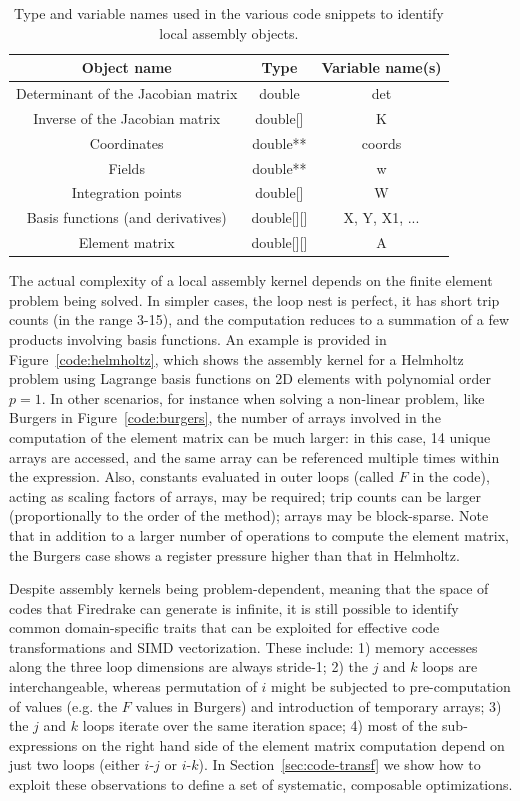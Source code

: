 \documentclass[conference]{IEEEtran}
\begin{document}
\begin{table}[h]
\begin{center}
\begin{tabulary}{1.0\columnwidth}{|C|C|C|}
\hline
Object name & Type & Variable name(s) \\\hline\hline
Determinant of the Jacobian matrix & double & det  \\ \hline
Inverse of the Jacobian matrix & double[] & K \\ \hline
Coordinates & double** & coords\\ \hline
Fields & double** & w \\ \hline
Integration points & double[] & W \\ \hline
Basis functions (and derivatives) & double[][] & X, Y, X1, ... \\ \hline
Element matrix & double[][] & A\\ \hline
\end{tabulary}
\end{center}
\caption{Type and variable names used in the various code snippets to identify local assembly objects.}
\label{table:map-name-letters}
\end{table}

The actual complexity of a local assembly kernel depends on the finite element problem being solved. In simpler cases, the loop nest is perfect, it has short trip counts (in the range 3-15), and the computation reduces to a summation of a few products involving basis functions. An example is provided in Figure~\ref{code:helmholtz}, which shows the assembly kernel for a Helmholtz problem using Lagrange basis functions on 2D elements with polynomial order $p=1$. In other scenarios, for instance when solving a non-linear problem, like Burgers in Figure~\ref{code:burgers}, the number of arrays involved in the computation of the element matrix can be much larger: in this case, 14 unique arrays are accessed, and the same array can be referenced multiple times within the expression. Also, constants evaluated in outer loops (called $F$ in the code), acting as scaling factors of arrays, may be required; trip counts can be larger (proportionally to the order of the method); arrays may be block-sparse. Note that in addition to a larger number of operations to compute the element matrix, the Burgers case shows a register pressure higher than that in Helmholtz. 

Despite assembly kernels being problem-dependent, meaning that the space of codes that Firedrake can generate is infinite, it is still possible to identify common domain-specific traits that can be exploited for effective code transformations and SIMD vectorization. These include: 1) memory accesses along the three loop dimensions are always stride-1; 2) the $j$ and $k$ loops are interchangeable, whereas permutation of $i$ might be subjected to pre-computation of values (e.g. the $F$ values in Burgers) and introduction of temporary arrays; 3) the $j$ and $k$ loops iterate over the same iteration space; 4) most of the sub-expressions on the right hand side of the element matrix computation depend on just two loops (either $i$-$j$ or $i$-$k$). In Section~\ref{sec:code-transf} we show how to exploit these observations to define a set of systematic, composable optimizations.
\end{document}
